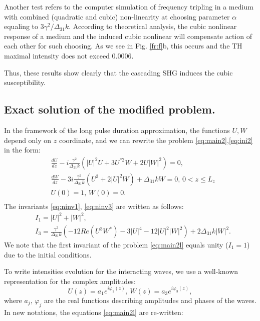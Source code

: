 \documentclass[a4paper, 12pt, onecolumn]{extarticle}
\begin{document}
Another test refers to the computer simulation of frequency tripling in a medium with combined (quadratic and cubic) non-linearity at choosing parameter $\alpha$ equaling to $3\gamma^2/\Delta_{31}k$. According to theoretical analysis, the cubic nonlinear response of a medium and the induced cubic nonlinear will compensate action of each other for such choosing. As we see in Fig. \ref{fr:f}b, this occurs and the TH maximal intensity does not exceed $0.0006$. 

Thus, these results show clearly that the cascading SHG induces the cubic susceptibility. 


\subsection*{Exact solution of the modified problem.}
In the framework of the long pulse duration approximation, the functions \(U,W\) depend only on \(z\) coordinate, and we can rewrite the problem \eqref{eq:main2},\eqref{eq:ini2} in the form:
\begin{equation}
\label{eq:main2l}
\begin{aligned}
&\frac{dU}{dz}-i\frac{\gamma^2}{\Delta_{21} k}(|U|^2U+3U^{*2}W+2U|W|^2)=0,\\
&\frac{dW}{dz}-3i\frac{\gamma^2}{\Delta_{21} k}(U^3+2|U|^2W)+\Delta_{31}kW=0,\,  0< z \leq L_z\\
&U(0)=1,\,W(0)=0.\\
\end{aligned}
\end{equation}
The invariants \eqref{eq:ninv1}, \eqref{eq:ninv3} are written as follows:
\begin{equation}
\label{eq:ninvs}
\begin{aligned}
&I_1=|U|^2+|W|^2,\\
&I_3=\frac{\gamma^2}{\Delta_{21}k}\left(-12Re(U^3W^*)-3|U|^4-12|U|^2|W|^2\right)+2\Delta_{31}k|W|^2.
\end{aligned}
\end{equation}
We note that the first invariant of the problem \eqref{eq:main2l} equals unity (\(I_1=1\)) due to the initial conditions.

To write intensities evolution for the interacting waves, we use a well-known representation for the complex amplitudes:
\begin{equation}
\label{eq:repr}
U(z)=a_1e^{i\varphi_1(z)},\,W(z)=a_3e^{i\varphi_3(z)},
\end{equation}
where \(a_j,\,\varphi_j\) are the real functions describing amplitudes and phases of the waves. In new notations, the equations \eqref{eq:main2l} are re-written:
\end{document}
